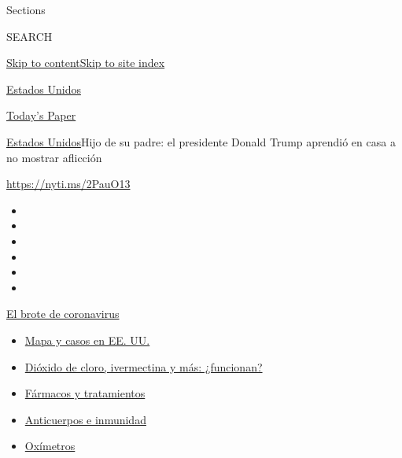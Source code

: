 Sections

SEARCH

\protect\hyperlink{site-content}{Skip to
content}\protect\hyperlink{site-index}{Skip to site index}

\href{https://www.nytimes3xbfgragh.onion/es/section/estados-unidos}{Estados
Unidos}

\href{https://myaccount.nytimes3xbfgragh.onion/auth/login?response_type=cookie\&client_id=vi}{}

\href{https://www.nytimes3xbfgragh.onion/section/todayspaper}{Today's
Paper}

\href{/es/section/estados-unidos}{Estados Unidos}\textbar{}Hijo de su
padre: el presidente Donald Trump aprendió en casa a no mostrar
aflicción

\url{https://nyti.ms/2PauO13}

\begin{itemize}
\item
\item
\item
\item
\item
\item
\end{itemize}

\href{https://www.nytimes3xbfgragh.onion/es/spotlight/coronavirus?action=click\&pgtype=Article\&state=default\&region=TOP_BANNER\&context=storylines_menu}{El
brote de coronavirus}

\begin{itemize}
\tightlist
\item
  \href{https://www.nytimes3xbfgragh.onion/es/interactive/2020/espanol/mundo/coronavirus-en-estados-unidos.html?action=click\&pgtype=Article\&state=default\&region=TOP_BANNER\&context=storylines_menu}{Mapa
  y casos en EE. UU.}
\item
  \href{https://www.nytimes3xbfgragh.onion/es/2020/07/23/espanol/america-latina/bolivia-cloro-coronavirus-ivermectina.html?action=click\&pgtype=Article\&state=default\&region=TOP_BANNER\&context=storylines_menu}{Dióxido
  de cloro, ivermectina y más: ¿funcionan?}
\item
  \href{https://www.nytimes3xbfgragh.onion/es/interactive/2020/science/coronavirus-tratamientos-curas.html?action=click\&pgtype=Article\&state=default\&region=TOP_BANNER\&context=storylines_menu}{Fármacos
  y tratamientos}
\item
  \href{https://www.nytimes3xbfgragh.onion/es/2020/07/28/espanol/ciencia-y-tecnologia/anticuerpos-coronavirus-inmunidad.html?action=click\&pgtype=Article\&state=default\&region=TOP_BANNER\&context=storylines_menu}{Anticuerpos
  e inmunidad}
\item
  \href{https://www.nytimes3xbfgragh.onion/es/2020/04/29/espanol/estilos-de-vida/oximetro-para-que-sirve.html?action=click\&pgtype=Article\&state=default\&region=TOP_BANNER\&context=storylines_menu}{Oxímetros}
\end{itemize}

